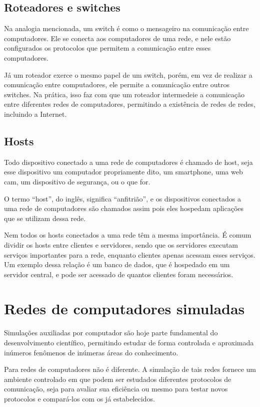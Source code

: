 \subsection{Roteadores e switches}
	Na analogia mencionada, um switch é como o mensageiro na comunicação entre computadores. Ele se conecta aos computadores de uma rede, e nele estão configurados os protocolos que permitem a comunicação entre esses computadores.

	Já um roteador\cite{cisco:switch} exerce o mesmo papel de um switch, porém, em vez de realizar a comunicação entre computadores, ele permite a comunicação entre outros switches. Na prática, isso faz com que um roteador intermedeie a comunicação entre diferentes redes de computadores, permitindo a existência de redes de redes, incluindo a Internet.

\subsection{Hosts}
	Todo dispositivo conectado a uma rede de computadores é chamado de host, seja esse dispositivo um computador propriamente dito, um smartphone, uma web cam, um dispositivo de segurança, ou o que for.

	O termo “host”, do inglês, significa “anfitrião”, e os dispositivos conectados a uma rede de computadores são chamados assim pois eles hospedam aplicações que se utilizam dessa rede.

	Nem todos os hosts conectados a uma rede têm a mesma importância. É comum dividir os hosts entre clientes e servidores, sendo que os servidores executam serviços importantes para a rede, enquanto clientes apenas acessam esses serviços. Um exemplo dessa relação é um banco de dados, que é hospedado em um servidor central, e pode ser acessado de quantos clientes foram necessários.


\section{Redes de computadores simuladas}
\label{ch:redes simuladas}

	Simulações auxiliadas por computador são hoje parte fundamental do desenvolvimento científico, permitindo estudar de forma controlada e aproximada inúmeros fenômenos de inúmeras áreas do conhecimento.

	Para redes de computadores não é diferente. A simulação de tais redes \cite{cse:wustl} fornece um ambiente controlado em que podem ser estudados diferentes protocolos de comunicação, seja para avaliar sua eficiência ou mesmo para testar novos protocolos e compará-los com os já estabelecidos.

